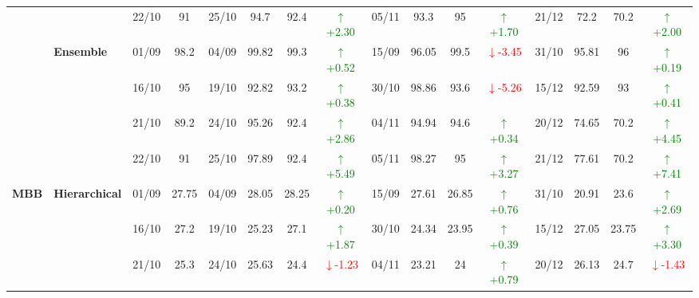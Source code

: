 {\begin{longtable}{llcc|cccc|cccc|cccc}
&
& 22/10 & 91 & 25/10 & 94.7 & 92.4 & \textcolor{green}{\(\uparrow\)+2.30} & 05/11 & 93.3 & 95 & \textcolor{green}{\(\uparrow\)+1.70} & 21/12 & 72.2 & 70.2 & \textcolor{green}{\(\uparrow\)+2.00} \\
\cmidrule(lr){2-16}


& \textbf{Ensemble}
& 01/09 & 98.2 & 04/09 & 99.82 & 99.3 & \textcolor{green}{\(\uparrow\)+0.52} & 15/09 & 96.05 & 99.5 & \textcolor{red}{\(\downarrow\)-3.45} & 31/10 & 95.81 & 96 & \textcolor{green}{\(\uparrow\)+0.19} \\

&
& 16/10 & 95 & 19/10 & 92.82 & 93.2 & \textcolor{green}{\(\uparrow\)+0.38} & 30/10 & 98.86 & 93.6 & \textcolor{red}{\(\downarrow\)-5.26} & 15/12 & 92.59 & 93 & \textcolor{green}{\(\uparrow\)+0.41} \\

&
& 21/10 & 89.2 & 24/10 & 95.26 & 92.4 & \textcolor{green}{\(\uparrow\)+2.86} & 04/11 & 94.94 & 94.6 & \textcolor{green}{\(\uparrow\)+0.34} & 20/12 & 74.65 & 70.2 & \textcolor{green}{\(\uparrow\)+4.45} \\

&
& 22/10 & 91 & 25/10 & 97.89 & 92.4 & \textcolor{green}{\(\uparrow\)+5.49} & 05/11 & 98.27 & 95 & \textcolor{green}{\(\uparrow\)+3.27} & 21/12 & 77.61 & 70.2 & \textcolor{green}{\(\uparrow\)+7.41} \\
\midrule



\multirow{12}{*}{\textbf{MBB}} 
& \textbf{Hierarchical}
& 01/09 & 27.75 & 04/09 & 28.05 & 28.25 & \textcolor{green}{\(\uparrow\)+0.20} & 15/09 & 27.61 & 26.85 & \textcolor{green}{\(\uparrow\)+0.76} & 31/10 & 20.91 & 23.6 & \textcolor{green}{\(\uparrow\)+2.69} \\

&
& 16/10 & 27.2 & 19/10 & 25.23 & 27.1 & \textcolor{green}{\(\uparrow\)+1.87} & 30/10 & 24.34 & 23.95 & \textcolor{green}{\(\uparrow\)+0.39} & 15/12 & 27.05 & 23.75 & \textcolor{green}{\(\uparrow\)+3.30} \\

&
& 21/10 & 25.3 & 24/10 & 25.63 & 24.4 & \textcolor{red}{\(\downarrow\)-1.23} & 04/11 & 23.21 & 24 & \textcolor{green}{\(\uparrow\)+0.79} & 20/12 & 26.13 & 24.7 & \textcolor{red}{\(\downarrow\)-1.43} \\


\end{longtable}}
